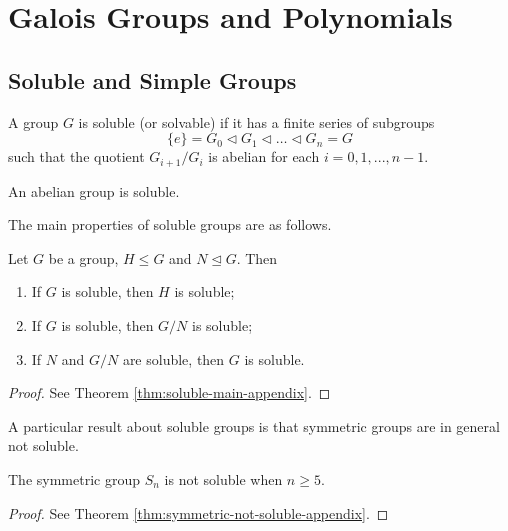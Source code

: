 \section{Galois Groups and Polynomials} \label{sec:galois-groups-and-polynomials}


\subsection{Soluble and Simple Groups}

\begin{definition} \label{def:soluble}
    A group $G$ is soluble (or solvable) if it has a finite series of subgroups 
    $$ \{ e \} = G_0 \triangleleft G_1 \triangleleft \dots \triangleleft G_n = G$$
    such that the quotient $G_{i+1} / G_{i}$ is abelian for each $i = 0, 1, ...,  n - 1$.
\end{definition}

\begin{observation}
    An abelian group is soluble. 
\end{observation}

The main properties of soluble groups are as follows. 

\begin{theorem} \label{thm:soluble-main}
    Let $G$ be a group, $H \le G$ and $N \trianglelefteq G$. Then 
    \begin{enumerate}[label=(\roman*)]
        \item If $G$ is soluble, then $H$ is soluble;
        \item If $G$ is soluble, then $G / N$ is soluble; 
        \item If $N$ and $G / N$ are soluble, then $G$ is soluble. 
    \end{enumerate}
\end{theorem}
\begin{proof}
	See Theorem \ref{thm:soluble-main-appendix}.
\end{proof}

A particular result about soluble groups is that symmetric groups are in general not soluble.

\begin{theorem} \label{thm:symmetric-not-soluble}
	The symmetric group $S_n$ is not soluble when $n \ge 5$. 
\end{theorem}
\begin{proof}
	See Theorem \ref{thm:symmetric-not-soluble-appendix}. 
\end{proof}


